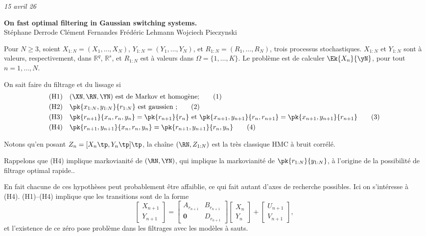 \documentclass[12pt, a4paper]{article}
\begin{document}
\noindent\hfill\textit{15 avril 26}

\begin{center}
  {\large\bfseries On fast optimal filtering in Gaussian switching systems.}\\[6pt]
  Stéphane Derrode \quad Clément Fernandes \quad Frédéric Lehmann \quad Wojciech Pieczynski
\end{center}

\medskip

Pour $N \geq 3$, soient $X_{1:N} = (X_1, \ldots, X_N)$, $Y_{1:N} = (Y_1, \ldots, Y_N)$, et
$R_{1:N} = (R_1, \ldots, R_N)$, trois processus stochastiques.
$X_{1:N}$ et $Y_{1:N}$ sont à valeurs, respectivement, dans $\mathbb{R}^q$, $\mathbb{R}^s$, et
$R_{1:N}$ est à valeurs dans $\Omega = \{1, \ldots, K\}$.
Le problème est de calculer $\Ek{X_n}{\yN}$, pour tout $n = 1, \ldots, N$.

On sait faire du filtrage et du lissage si
\begin{align}
  \text{(H1)} \quad & (\XN, \RN, \YN)
    \text{ est de Markov et homogène;} \tag{1} \\
  \text{(H2)} \quad & \pk{x_{1:N}, y_{1:N}}{r_{1:N}}
    \text{ est gaussien ;} \tag{2} \\
  \text{(H3)} \quad & \pk{r_{n+1}}{x_n, r_n, y_n} = \pk{r_{n+1}}{r_n}
    \ \text{et}\ \pk{x_{n+1}, y_{n+1}}{r_n, r_{n+1}} = \pk{x_{n+1}, y_{n+1}}{r_{n+1}}
    \tag{3} \\
  \text{(H4)} \quad & \pk{r_{n+1}, y_{n+1}}{x_n, r_n, y_n} = \pk{r_{n+1}, y_{n+1}}{r_n, y_n}
    \tag{4}
\end{align}

Notons qu'en posant $Z_n = [X_n\tp, Y_n\tp]\tp$, la chaîne $(\RN, Z_{1:N})$ est la très classique
HMC à bruit corrélé.

Rappelons que (H4) implique markovianité de $(\RN, \YN)$, qui implique la markovianité de
$\pk{r_{1:N}}{y_{1:N}}$, à l'origine de la possibilité de filtrage optimal rapide..

En fait chacune de ces hypothèses peut probablement être affaiblie, ce qui fait autant d'axes
de recherche possibles. Ici on s'intéresse à (H4). (H1)--(H4) implique que les transitions
sont de la forme
\begin{equation}
  \begin{bmatrix} X_{n+1} \\ Y_{n+1} \end{bmatrix}
  = \begin{bmatrix} A_{r_{n+1}} & B_{r_{n+1}} \\ \mathbf{0} & D_{r_{n+1}} \end{bmatrix}
    \begin{bmatrix} X_n \\ Y_n \end{bmatrix}
  + \begin{bmatrix} U_{n+1} \\ V_{n+1} \end{bmatrix}, \tag{5}
\end{equation}
et l'existence de ce zéro pose problème dans les filtrages avec les modèles à sauts.
\end{document}
